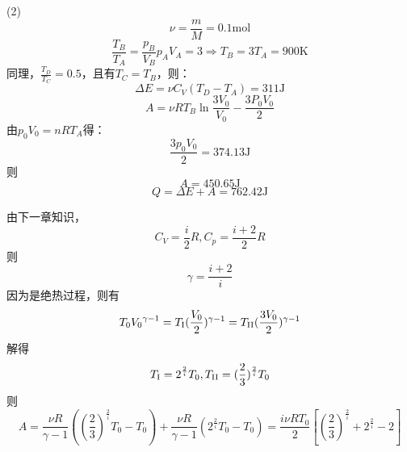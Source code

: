 (2)%
\[\nu  = \frac{m}{M} = 0.1\mathrm{mol}\]
\[\frac{T_B}{T_A}=\frac{p_B}{V_B}{p_A}{V_A} = 3 \Rightarrow {T_B} = 3{T_A} = 900\mathrm{K}\]
同理，$\frac{T_D}{T_C}=0.5$，且有$T_C=T_B$，则：
\[\Delta E =\nu {C_V}({T_D}-{T_A})= 311\mathrm{J}\]
\[A =\nu R{T_B}\ln \frac{3{V_0}}{V_0}-\frac{{3P_0V_0}}{2}\]
由${p_0}{V_0} = nR{T_A}$得：
\[\frac{{3{p_0}{V_0}}}{2} = 374.13\mathrm{J}\]
则\[A = 450.65\mathrm{J}\]
\[Q = \Delta E+A = 762.42\mathrm{J}\]

\solve 由下一章知识，\[{C_V} = \frac{i}{2}R,{C_p} = \frac{{i + 2}}{2}R\]
则
\[\gamma=\frac{{i + 2}}{i}\]
因为是绝热过程，则有
\[{T_0}{V_0}^{\gamma-1}={T_\text{\RNum{1}}}{(\frac{V_0}{2})^{\gamma-1}}= {T_\text{\RNum{2}}}{(\frac{{3{V_0}}}{2})^{\gamma-1}}\]
解得
\[{T_\text{\RNum{1}}} = {2^{\frac{2}{i}}}{T_0},{T_\text{\RNum{2}}} = {(\frac{2}{3})^{\frac{2}{i}}}{T_0}\]
则
\[A = \frac{{\nu R}}{{\gamma-1}}({(\frac{2}{3})^{\frac{2}{i}}}{T_0} - {T_0}) + \frac{{\nu R}}{{\gamma  - 1}}({2^{\frac{2}{i}}}{T_0}-{T_0}) = \frac{{i\nu R{T_0}}}{2}[{(\frac{2}{3})^{\frac{2}{i}}} + {2^{\frac{2}{i}}} - 2]\]